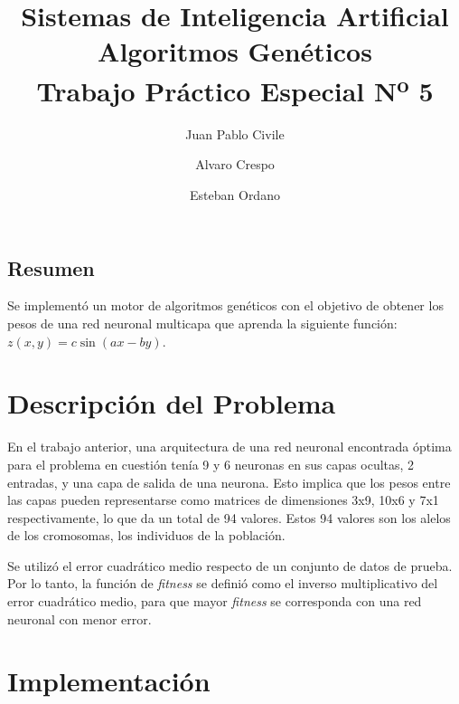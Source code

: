 \documentclass[letterpaper,twocolumn,10pt]{article}
\begin{document}
\date{}

\title{\Large Sistemas de Inteligencia Artificial \\
\Large \bf Algoritmos Genéticos \\
\Large Trabajo Práctico Especial N\textsuperscript{o} 5}

\author{
{\rm Juan Pablo Civile}
\and
{\rm Alvaro Crespo}
\and
{\rm Esteban Ordano}
}

\maketitle

\thispagestyle{empty}


\subsection*{Resumen}
Se implementó un motor de algoritmos genéticos con el objetivo de obtener los pesos de una
red neuronal multicapa que aprenda la siguiente función: $z(x, y) = c\sin(a x - b y)$.

\section{Descripción del Problema}

En el trabajo anterior, una arquitectura de una red neuronal encontrada óptima para el
problema en cuestión tenía 9 y 6 neuronas en sus capas ocultas, 2 entradas, y una capa de
salida de una neurona. Esto implica que los pesos entre las capas pueden representarse como
matrices de dimensiones 3x9, 10x6 y 7x1 respectivamente, lo que da un total de 94
valores. Estos 94 valores son los alelos de los cromosomas, los individuos de la
población.

Se utilizó el error cuadrático medio respecto de un conjunto de datos de prueba.
Por lo tanto, la función de \textit{fitness} se definió como el inverso multiplicativo
del error cuadrático medio, para que mayor \textit{fitness} se corresponda con una red
neuronal con menor error.

\section{Implementación}
\end{document}
